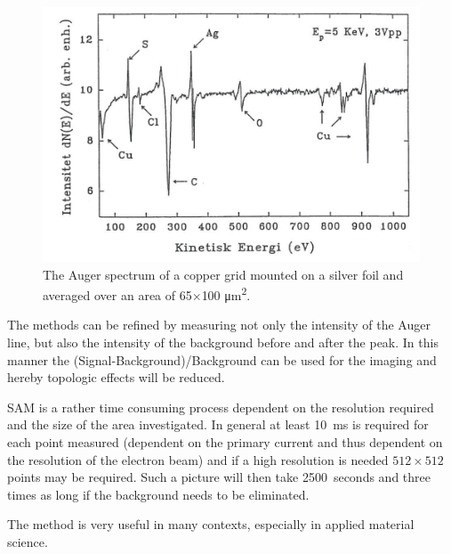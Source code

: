 \begin{figure}[h!]
	\begin{center}
	\includegraphics[scale=4]{figures/06_16.png}
	\caption{The Auger spectrum of a copper grid mounted on a silver foil and averaged over an area of 65$\times$100 \si{\micro m^2}.}
	\label{fig:cuagaes}
	\end{center}
\end{figure}

The methods can be refined by measuring not only the intensity of the Auger line, but also the intensity of the background before and after the peak. In this manner the (Signal-Background)/Background can be used for the imaging and hereby topologic effects will be reduced.

SAM is a rather time consuming process dependent on the resolution required and the size of the area investigated. In general at least \SI{10}{ms} is required for each point measured (dependent on the primary current and thus dependent on the resolution of the electron beam) and if a high resolution is needed $512\times512$ points may be required. Such a picture will then take \SI{2500}{seconds} and three times as long if the background needs to be eliminated.

The method is very useful in many contexts, especially in applied material science.

